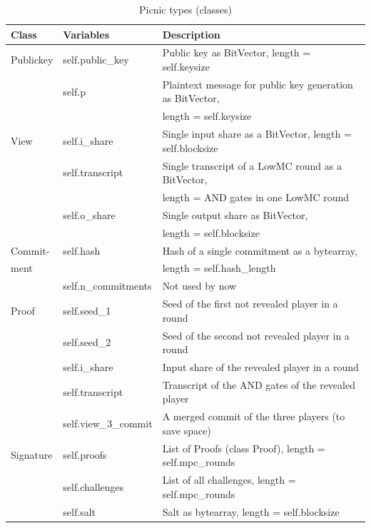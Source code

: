 \documentclass[]{article}
\begin{document}
\begin{table}[htbp]
\begin{center}
\begin{tabular}{|l|l|l|}
\hline
\textbf{Class}  & \textbf{Variables} & \textbf{Description} \\ \hline
Publickey & self.public\_key & Public key as BitVector, length = self.keysize \\
		  & self.p			  & Plaintext message for public key generation as BitVector, \\
		  &					  & length =  self.keysize\\ \hline
View	  & self.i\_share     & Single input share as a BitVector, length = self.blocksize \\ 
		  & self.transcript  & Single transcript of a LowMC round as a BitVector,\\
		  &					  & length = AND gates in one LowMC round\\
		  & self.o\_share     & Single output share as BitVector, \\
		  &                   & length = self.blocksize \\ \hline
Commit-   & self.hash       & Hash of a single commitment as a bytearray,\\
ment      &                 & length = self.hash\_length \\
		  & self.n\_commitments & Not used by now \\ \hline
Proof     & self.seed\_1  & Seed of the first not revealed player in a round\\
		  & self.seed\_2  & Seed of the second not revealed player in a round\\
		  & self.i\_share & Input share of the revealed player in a round\\
		  & self.transcript & Transcript of the AND gates of the revealed player\\
		  & self.view\_3\_commit & A merged commit of the three players (to save space)\\ \hline
Signature & self.proofs & List of Proofs (class Proof), length = self.mpc\_rounds\\
		  & self.challenges & List of all challenges, length = self.mpc\_rounds\\
		  & self.salt & Salt as bytearray, length = self.blocksize\\ \hline
\end{tabular}
\caption{Picnic types (classes)}
\label{tab:types}
\end{center}
\end{table}\\
\end{document}
